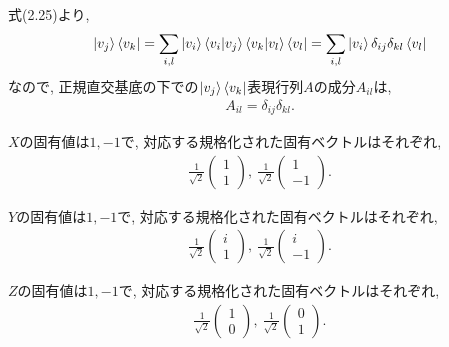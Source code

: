 \begin{ex}
    \label{ex2.10}
    式(2.25)より,
    \begin{align*}
        \ket{v_j}\bra{v_k}
        = \sum_{i,l} \ket{v_i}\braket{v_i|v_j}\braket{v_k|v_l}\bra{v_l}
        = \sum_{i,l} \ket{v_i}\delta_{ij}\delta_{kl}\bra{v_l}
    \end{align*}
    なので, 正規直交基底の下での$\ket{v_j}\bra{v_k}$表現行列$A$の成分$A_{il}$は,
    \begin{align*}
        A_{il} = \delta_{ij}\delta_{kl}.
    \end{align*}
\end{ex}

\begin{ex}
    \label{ex2.11}
    $X$の固有値は$1,-1$で, 対応する規格化された固有ベクトルはそれぞれ,
    \begin{align*}
        \frac{1}{\sqrt{2}}
        \begin{pmatrix}
            1 \\ 1
        \end{pmatrix}
        ,\
        \frac{1}{\sqrt{2}}
        \begin{pmatrix}
            1 \\ -1
        \end{pmatrix}.
    \end{align*}

    $Y$の固有値は$1,-1$で, 対応する規格化された固有ベクトルはそれぞれ,
    \begin{align*}
        \frac{1}{\sqrt{2}}
        \begin{pmatrix}
            i \\ 1
        \end{pmatrix}
        ,\
        \frac{1}{\sqrt{2}}
        \begin{pmatrix}
            i \\ -1
        \end{pmatrix}.
    \end{align*}

    $Z$の固有値は$1,-1$で, 対応する規格化された固有ベクトルはそれぞれ,
    \begin{align*}
        \frac{1}{\sqrt{2}}
        \begin{pmatrix}
            1 \\ 0
        \end{pmatrix}
        ,\
        \frac{1}{\sqrt{2}}
        \begin{pmatrix}
            0 \\ 1
        \end{pmatrix}.
    \end{align*}
\end{ex}


